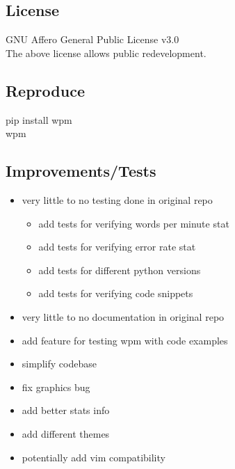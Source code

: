 \documentclass{article}
\begin{document}
\subsection*{License}
GNU Affero General Public License v3.0\\
The above license allows public redevelopment.

\subsection*{Reproduce}
pip install wpm\\
wpm\\

\subsection*{Improvements/Tests}
\begin{itemize}
    \item very little to no testing done in original repo
    \begin{itemize}
        \item add tests for verifying words per minute stat
        \item add tests for verifying error rate stat
        \item add tests for different python versions
        \item add tests for verifying code snippets
    \end{itemize}
    \item very little to no documentation in original repo
    \item add feature for testing wpm with code examples
    \item simplify codebase
    \item fix graphics bug
    \item add better stats info
    \item add different themes
    \item potentially add vim compatibility
\end{itemize}
\end{document}

